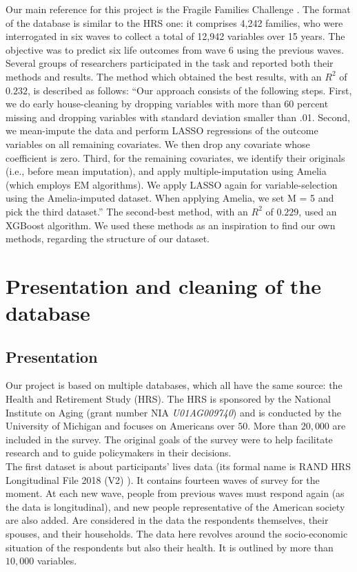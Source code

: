 \documentclass[]{article}
\begin{document}
\noindent
Our main reference for this project is the Fragile Families Challenge \cite{challenge2017}. The format of the database is similar to the HRS one: it comprises 4,242 families, who were interrogated in six waves to collect a total of 12,942 variables over 15 years. The objective was to predict six life outcomes from wave 6 using the previous waves. Several groups of researchers participated in the task and reported both their methods and results. The method which obtained the best results, with an $R^2$ of $0.232$, is described as follows: “Our approach consists of the following steps. First, we do early house-cleaning by dropping variables with more than 60 percent missing and dropping variables with standard deviation smaller than .01. Second, we mean-impute the data and perform LASSO regressions of the outcome variables on all remaining covariates. We then drop any covariate whose coefficient is zero. Third, for the remaining covariates, we identify their originals (i.e., before mean imputation), and apply multiple-imputation using Amelia (which employs EM algorithms). We apply LASSO again for variable-selection using the Amelia-imputed dataset. When applying Amelia, we set M = 5 and pick the third dataset.” 
The second-best method, with an $R^2$ of $0.229$, used an XGBoost algorithm.
We used these methods as an inspiration to find our own methods, regarding the structure of our dataset.

\section{Presentation and cleaning of the database}
\subsection{Presentation}
Our project is based on multiple databases, which all have the same source: the Health and Retirement Study (HRS). The HRS is sponsored by the National Institute on Aging (grant number NIA \textit{U01AG009740}) and is conducted by the University of Michigan and focuses on Americans over $50$. More than $20,000$ are included in the survey. The original goals of the survey were to help facilitate research and to guide policymakers in their decisions.\\

\noindent
The first dataset is about participants’ lives data (its formal name is RAND HRS Longitudinal File 2018 (V2) \cite{hrs2014}). It contains fourteen waves of survey for the moment. At each new wave, people from previous waves must respond again (as the data is longitudinal), and new people representative of the American society are also added. Are considered in the data the respondents themselves, their spouses, and their households. The data here revolves around the socio-economic situation of the respondents but also their health. It is outlined by more than $10,000$ variables.\\
\end{document}
